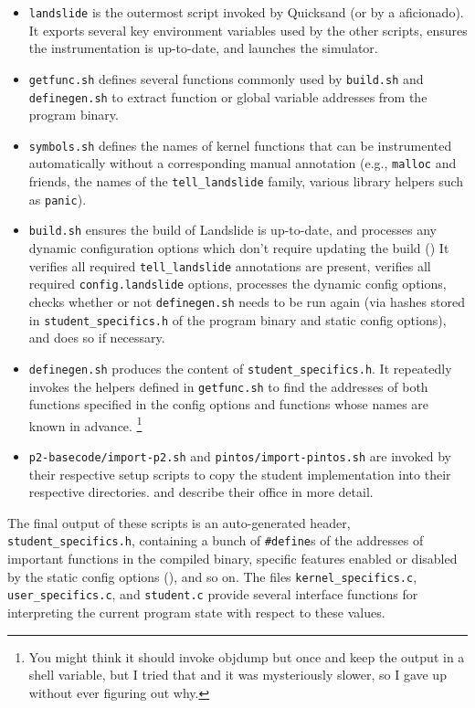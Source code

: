 \begin{itemize}
	\item {\tt landslide} is the outermost script invoked by Quicksand (or by a \sect{\ref{sec:landslide-directly}} aficionado).
		It exports several key environment variables used by the other scripts,
		ensures the instrumentation is up-to-date,
		and launches the simulator.
	\item {\tt getfunc.sh} defines several functions commonly used by {\tt build.sh} and {\tt definegen.sh} to extract function or global variable addresses from the program binary.
	\item {\tt symbols.sh} defines the names of kernel functions that can be instrumented automatically without a corresponding manual annotation (e.g., {\tt malloc} and friends, the names of the {\tt tell\_landslide} family, various library helpers such as {\tt panic}).
	\item {\tt build.sh} ensures the build of Landslide is up-to-date,
		and processes any dynamic configuration options which don't require updating the build (\sect{\ref{sec:landslide-dynamicconfig}})
		It verifies all required {\tt tell\_landslide} annotations are present,
		verifies all required {\tt config.\allowbreak{}landslide} options,
		processes the dynamic config options,
		checks whether or not {\tt definegen.sh} needs to be run again (via hashes stored in {\tt student\_specifics.h} of the program binary and static config options),
		and does so if necessary.
	\item {\tt definegen.sh} produces the
		content of {\tt student\_specifics.h}.
		It repeatedly invokes the helpers defined in {\tt getfunc.sh}
		to find the addresses of both functions specified in the config options
		and functions whose names are known in advance.%
		\footnote{You might think it should invoke objdump but once and keep the output in a shell variable,
		but I tried that and it was mysteriously slower, so I gave up without ever figuring out why.}
	\item {\tt p2-basecode/import-p2.sh} and {\tt pintos/import-pintos.sh}
		are invoked by their respective setup scripts
		to copy the student implementation into their respective directories.
		\sect{\ref{sec:education-pebbles-instrumentation}} and \sect{\ref{sec:education-pintos-instrumentation}}
		describe their office in more detail.
\end{itemize}

The final output of these scripts is an auto-generated header, {\tt student\_specifics.h},
containing a bunch of {\tt \#define}s of the addresses of important functions in the compiled binary,
specific features enabled or disabled by the static config options (\sect{\ref{sec:landslide-staticconfig}}),
and so on.
The files {\tt kernel\_specifics.c}, {\tt user\_specifics.c}, and {\tt student.c} provide several interface functions
for interpreting the current program state with respect to these values.

